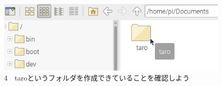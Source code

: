 \documentclass[a4paper,12pt]{jarticle}
\begin{document}
\begin{figure}[ht]
  \centering
  \begin{minipage}{0.9\textwidth}
  \includegraphics[width=\linewidth]{textbook-img040.png}
    4　taroというフォルダを作成できていることを確認しよう
  \end{minipage}

\end{figure}
\clearpage
\end{document}
